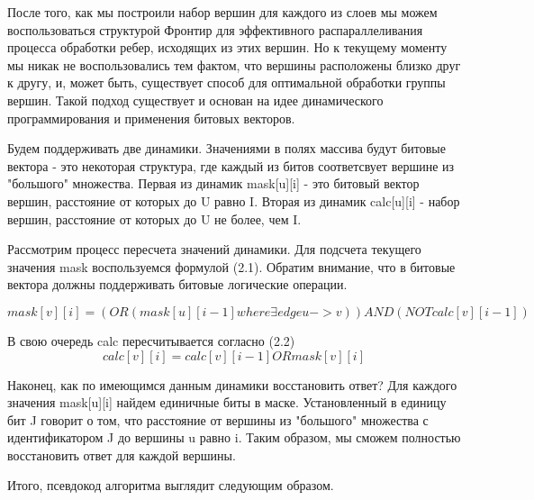  После того, как мы построили набор вершин для каждого из слоев мы можем воспользоваться структурой Фронтир для эффективного распараллеливания процесса обработки ребер, исходящих из этих вершин. Но к текущему моменту мы никак не воспользовались тем фактом, что вершины расположены близко друг к другу, и, может быть, существует способ для оптимальной обработки группы вершин. Такой подход существует и основан на идее динамического программирования и применения битовых векторов. 
 
 Будем поддерживать две динамики. Значениями в полях массива будут битовые вектора - это некоторая структура, где каждый из битов соответсвует вершине из "большого" множества. Первая из динамик mask[u][i] - это битовый вектор вершин, расстояние от которых до U равно I. Вторая из динамик calc[u][i] - набор вершин, расстояние от которых до U не более, чем I. 
 
 Рассмотрим процесс пересчета значений динамики. Для подсчета текущего значения mask воспользуемся формулой (2.1). Обратим внимание, что в битовые вектора должны поддерживать битовые логические операции. 
  
\begin{equation}
mask[v][i] = (OR (mask[u][i - 1] where \exists edge u->v)) AND (NOT calc[v][i - 1])
\end{equation}

В свою очередь calc пересчитывается согласно (2.2)
\begin{equation}
calc[v][i] = calc[v][i - 1] OR mask[v][i]
\end{equation}

Наконец, как по имеющимся данным динамики восстановить ответ? Для каждого значения mask[u][i] найдем единичные биты в маске. Установленный в единицу бит J говорит о том, что расстояние от вершины из "большого" множества с идентификатором J до вершины u равно i. Таким образом, мы сможем полностью восстановить ответ для каждой вершины. 


Итого, псевдокод алгоритма выглядит следующим образом.

